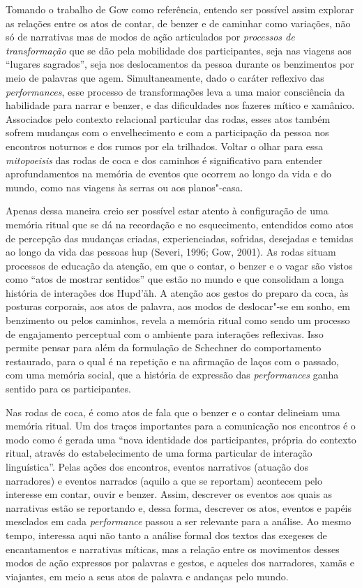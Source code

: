 Tomando o trabalho de Gow como referência, entendo ser possível assim
explorar as relações entre os atos de contar, de benzer e de caminhar
como variações, não só de narrativas mas de modos de ação articulados
por \emph{processos de transformação} que se dão pela mobilidade dos
participantes, seja nas viagens aos ``lugares sagrados'', seja nos
deslocamentos da pessoa durante os benzimentos por meio de palavras que
agem. Simultaneamente, dado o caráter reflexivo das \emph{performances},
esse processo de transformações leva a uma maior consciência da
habilidade para narrar e benzer, e das dificuldades nos fazeres mítico e
xamânico. Associados pelo contexto relacional particular das rodas,
esses atos também sofrem mudanças com o envelhecimento e com a
participação da pessoa nos encontros noturnos e dos rumos por ela
trilhados. Voltar o olhar para essa \emph{mitopoeisis} das rodas de coca
e dos caminhos é significativo para entender aprofundamentos na memória
de eventos que ocorrem ao longo da vida e do mundo, como nas viagens às
serras ou aos planos"-casa.

Apenas dessa maneira creio ser possível estar atento à configuração de
uma memória ritual que se dá na recordação e no esquecimento, entendidos
como atos de percepção das mudanças criadas, experienciadas, sofridas,
desejadas e temidas ao longo da vida das pessoas hup (Severi, 1996; Gow,
2001). As rodas situam processos de educação da atenção, em que o
contar, o benzer e o vagar são vistos como ``atos de mostrar sentidos''
que estão no mundo e que consolidam a longa história de interações dos
Hupd'äh. A atenção aos gestos do preparo da coca, às posturas corporais,
aos atos de palavra, aos modos de deslocar"-se em sonho, em benzimento ou
pelos caminhos, revela a memória ritual como sendo um processo de
engajamento perceptual com o ambiente para interações reflexivas. Isso
permite pensar para além da formulação de Schechner do comportamento
restaurado, para o qual é na repetição e na afirmação de laços com o
passado, com uma memória social, que a história de expressão das
\emph{performances} ganha sentido para os participantes.

Nas rodas de coca, é como atos de fala que o benzer e o contar delineiam
uma memória ritual. Um dos traços importantes para a comunicação nos
encontros é o modo como é gerada uma ``nova identidade dos
participantes, própria do contexto ritual, através do estabelecimento de
uma forma particular de interação linguística''. Pelas ações dos
encontros, eventos narrativos (atuação dos narradores) e eventos
narrados (aquilo a que se reportam) acontecem pelo interesse em contar,
ouvir e benzer. Assim, descrever os eventos aos quais as narrativas
estão se reportando e, dessa forma, descrever os atos, eventos e papéis
mesclados em cada \emph{performance} passou a ser relevante para a
análise. Ao mesmo tempo, interessa aqui não tanto a análise formal dos
textos das exegeses de encantamentos e narrativas míticas, mas a relação
entre os movimentos desses modos de ação expressos por palavras e
gestos, e aqueles dos narradores, xamãs e viajantes, em meio a seus atos
de palavra e andanças pelo mundo.

